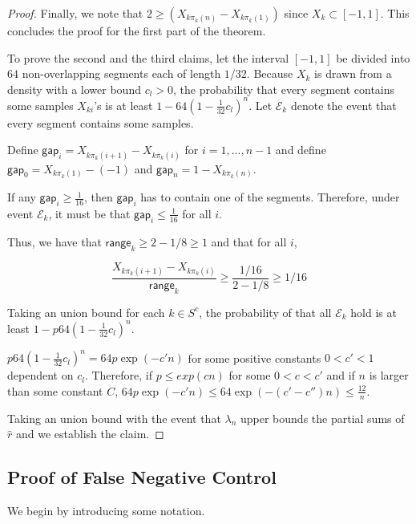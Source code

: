 \begin{proof}
Finally, we note that $2 \geq (X_{k\pi_k(n)} - X_{k\pi_k(1)})$ since $X_k \subset [-1,1]$. This concludes the proof for the first part of the theorem. 

To prove the second and the third claims, let the interval $[-1, 1]$ be divided into $64$ non-overlapping segments each of length $1/32$. Because $X_k$ is drawn from a density with a lower bound $c_l > 0$, the probability that every segment contains some samples $X_{ki}$'s is at least $1-64 \left( 1 - \frac{1}{32} c_l \right)^n$. Let $\mathcal{E}_k$ denote the event that every segment contains some samples. 

Define $\mathsf{gap}_i = X_{k \pi_k(i+1)} - X_{k \pi_k(i)}$ for $i=1,...,n-1$ and define $\mathsf{gap}_0 = X_{k \pi_k(1)} - (-1)$ and $\mathsf{gap}_{n} = 1 - X_{k\pi_k(n)}$. 

If any $\mathsf{gap}_i \geq \frac{1}{16}$, then $\mathsf{gap}_i$ has to contain one of the segments. Therefore, under event $\mathcal{E}_k$, it must be that $\mathsf{gap}_i \leq \frac{1}{16}$ for all $i$.

Thus, we have that $\mathsf{range}_k \geq 2 - 1/8 \geq 1$ and that for all $i$,

\[
\frac{X_{k\pi_k(i+1)} - X_{k \pi_k(i)}}{\mathsf{range}_k} \geq 
\frac{ 1/16 }{ 2 - 1/8} \geq 1/16
\]

Taking an union bound for each $k \in S^c$, the probability of that all $\mathcal{E}_k$ hold is at least $1 - p 64 \left( 1 - \frac{1}{32} c_l \right)^n$.

$p64 \left( 1 - \frac{1}{32} c_l \right)^n = 64 p \exp( - c' n)$ for some positive constants $0< c' < 1$ dependent on $c_l$. Therefore, if $p \leq exp( c n)$ for some $0<c < c'$ and if $n$ is larger than some constant $C$, $64 p \exp( - c' n) \leq 64 \exp( - (c' - c'') n) \leq \frac{12}{n}$.

Taking an union bound with the event that $\lambda_n$ upper bounds the partial sums of $\hat{r}$ and we establish the claim. 

\end{proof}


 
 
 \subsection{Proof of False Negative Control}
 \label{sec:false_negative_proof}
 We begin by introducing some notation.
